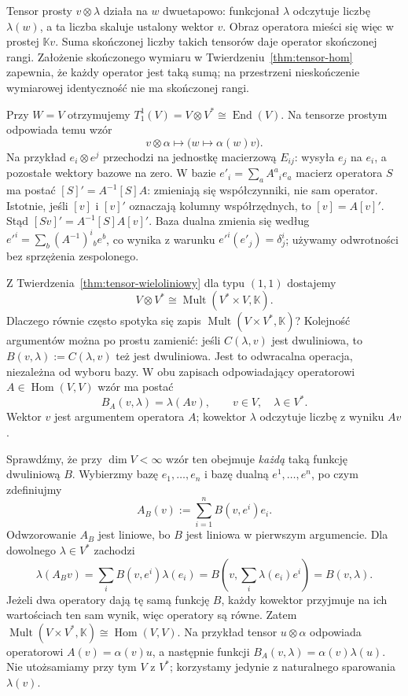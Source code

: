 Tensor prosty $v\otimes\lambda$ działa na $w$ dwuetapowo:
funkcjonał $\lambda$ odczytuje liczbę $\lambda(w)$,
a ta liczba skaluje ustalony wektor $v$.
Obraz operatora mieści się więc w prostej $\mathbb Kv$.
Suma skończonej liczby takich tensorów daje operator skończonej
rangi. Założenie skończonego wymiaru w Twierdzeniu~\ref{thm:tensor-hom}
zapewnia, że każdy operator jest taką sumą;
na przestrzeni nieskończenie wymiarowej identyczność nie ma
skończonej rangi.

Przy $W=V$ otrzymujemy
$T^1_1(V)=V\otimes V^*\cong\operatorname{End}(V)$.
Na tensorze prostym odpowiada temu wzór
\begin{equation}\label{eq:endo-tensor}
 v\otimes\alpha\longmapsto
 \bigl(w\longmapsto\alpha(w)v\bigr).
\end{equation}
Na przykład $e_i\otimes e^j$ przechodzi na jednostkę
macierzową $E_{ij}$: wysyła $e_j$ na $e_i$, a pozostałe
wektory bazowe na zero. W bazie $e'_i=\sum_a A^a{}_i e_a$
macierz operatora $S$ ma postać $[S]'=A^{-1}[S]A$:
zmieniają się współczynniki, nie sam operator.
Istotnie, jeśli $[v]$ i $[v]'$ oznaczają kolumny współrzędnych,
to $[v]=A[v]'$. Stąd $[Sv]'=A^{-1}[S]A[v]'$.
Baza dualna zmienia się według
$e'^i=\sum_b(A^{-1})^i{}_b e^b$, co wynika z warunku
$e'^i(e'_j)=\delta^i_j$; używamy odwrotności bez sprzężenia zespolonego.

\begin{uwaga}
\label{rem:mult-hom}
Z Twierdzenia~\ref{thm:tensor-wieloliniowy} dla typu $(1,1)$
dostajemy
\[
 V\otimes V^*\cong\operatorname{Mult}(V^*\times V,\mathbb K).
\]
Dlaczego równie często spotyka się zapis
$\operatorname{Mult}(V\times V^*,\mathbb K)$?
Kolejność argumentów można po prostu zamienić: jeśli
$C(\lambda,v)$ jest dwuliniowa, to $B(v,\lambda):=C(\lambda,v)$
też jest dwuliniowa. Jest to odwracalna operacja, niezależna
od wyboru bazy. W obu zapisach odpowiadający operatorowi
$A\in\operatorname{Hom}(V,V)$ wzór ma postać
\begin{equation}\label{eq:mult-operator}
 B_A(v,\lambda)=\lambda(Av),
 \qquad v\in V,\quad\lambda\in V^*.
\end{equation}
Wektor $v$ jest argumentem operatora $A$; kowektor
$\lambda$ odczytuje liczbę z wyniku $Av$.

Sprawdźmy, że przy $\dim V<\infty$ wzór ten obejmuje
\emph{każdą} taką funkcję dwuliniową $B$. Wybierzmy bazę
$e_1,\ldots,e_n$ i bazę dualną $e^1,\ldots,e^n$, po czym
zdefiniujmy
\[
 A_B(v):=\sum_{i=1}^n B(v,e^i)e_i.
\]
Odwzorowanie $A_B$ jest liniowe, bo $B$ jest liniowa w pierwszym
argumencie. Dla dowolnego $\lambda\in V^*$ zachodzi
\[
 \lambda(A_Bv)=\sum_i B(v,e^i)\lambda(e_i)
 =B\!\left(v,\sum_i\lambda(e_i)e^i\right)=B(v,\lambda).
\]
Jeżeli dwa operatory dają tę samą funkcję $B$, każdy kowektor
przyjmuje na ich wartościach ten sam wynik, więc operatory
są równe. Zatem
$\operatorname{Mult}(V\times V^*,\mathbb K)
 \cong\operatorname{Hom}(V,V)$.
Na przykład tensor $u\otimes\alpha$ odpowiada operatorowi
$A(v)=\alpha(v)u$, a następnie funkcji
$B_A(v,\lambda)=\alpha(v)\lambda(u)$.
Nie utożsamiamy przy tym $V$ z $V^*$; korzystamy jedynie
z naturalnego sparowania $\lambda(v)$.
\end{uwaga}

